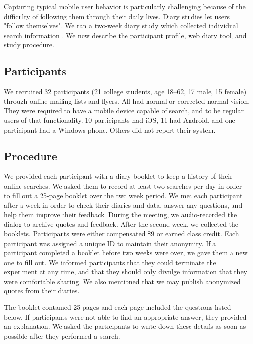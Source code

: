 Capturing typical mobile user behavior is particularly challenging because of the difficulty of following them through their daily lives. Diary studies let users "follow themselves". We ran a two-week diary study which collected individual search information \cite{Sohn:2008}. We now describe the participant profile, web diary tool, and study procedure.

\subsection{Participants}
We recruited 32 participants (21 college students, age 18--62, 17 male, 15 female) through online mailing lists and flyers. All had normal or corrected-normal vision. They were required to have a mobile device capable of search, and to be regular users of that functionality. 10 participants had iOS, 11 had Android, and one participant had a Windows phone. Others did not report their system.


\subsection{Procedure}
We provided each participant with a diary booklet to keep a history of their online searches.  We asked them to record at least two searches per day in order to fill out a 25-page booklet over the two week period. We met each participant after a week in order to check their diaries and data, answer any questions, and help them improve their feedback. During the meeting, we audio-recorded the dialog to archive quotes and feedback. After the second week, we collected the booklets. Participants were either compensated \$9 or earned class credit. Each participant was assigned a unique ID to maintain their anonymity. If a participant completed a booklet before two weeks were over, we gave them a new one to fill out. We informed participants that they could terminate the experiment at any time, and that they should only divulge information that they were comfortable sharing. We also mentioned that we may publish anonymized quotes from their diaries. 

The booklet contained 25 pages and each page included the questions listed below. If participants were not able to find an appropriate answer, they provided an explanation. We asked the participants to write down these details as soon as possible after they performed a search. 

